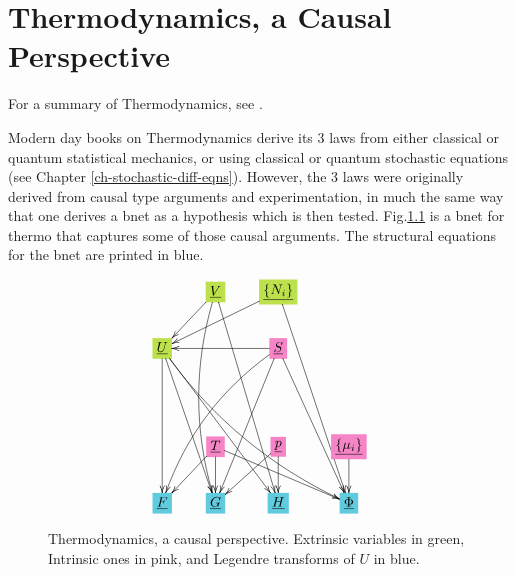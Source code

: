 \chapter{Thermodynamics, a Causal Perspective}
\label{ch-thermo}

For a summary of Thermodynamics, see
\cite{wiki-thermo}.

Modern day books on Thermodynamics
derive its 3 laws from either classical
or quantum statistical mechanics, or using classical or quantum stochastic  equations
(see Chapter \ref{ch-stochastic-diff-eqns}). However,
the 3 laws
were originally derived from causal type
	arguments and experimentation, in much
	the same way that one  derives a bnet
	as a hypothesis which is then tested.
Fig.\ref{fig-texnn-for-thermo} is a bnet for thermo that
captures some of those causal arguments.
The structural equations for the bnet are printed in blue.

	


\begin{figure}[h!]\centering
	$$\xymatrix{
		&*+[F*:SpringGreen]{\underline{V}}\ar@/_1pc/[dddd]\ar[ddddr]\ar[dl]&*+[F*:SpringGreen]{\underline{\{N_i\}}}\ar[ddddr]\ar[dll]&
		\\
		*+[F*:SpringGreen]{\underline{U}}\ar@/_1pc/[dddrrr]\ar[ddd]\ar[dddr]\ar[dddrr]&&*+[F*:Lavender]{\underline{S}}\ar[dddr]\ar@/_1pc/[dddll]\ar[dddl]\ar[ll]&
		\\
		&&&
		\\
		&*+[F*:Lavender]{\underline{T}}\ar[drr]\ar[dl]\ar[d]&*+[F*:Lavender]{\underline{p}}\ar[dl]\ar[d]&*+[F*:Lavender]{\underline{\{\mu_i\}}}\ar[d]
		\\
		*+[F*:SkyBlue]{\underline{F}}&*+[F*:SkyBlue]{\underline{G}}&*+[F*:SkyBlue]{\underline{H}}&*+[F*:SkyBlue]{\underline{\Phi}}
	}$$
	\caption{Thermodynamics, a causal perspective. Extrinsic variables in green, Intrinsic ones in pink, and Legendre  transforms of $U$ in blue.}
	\label{fig-texnn-for-thermo}
\end{figure}

